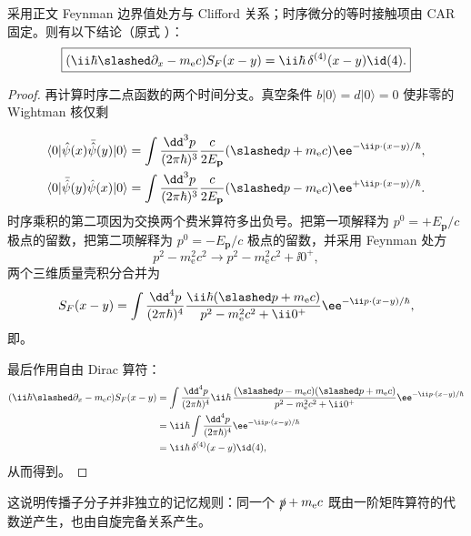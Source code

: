 \begin{proposition}
采用正文 Feynman 边界值处方与 Clifford 关系；时序微分的等时接触项由 CAR 固定。则有以下结论（原式 ）：
\begin{equation*}
 \boxed{
 (\ii\hbar\slashed\partial_x-m_{\mathrm e} c)S_F(x-y)
 =\ii\hbar\,\delta^{(4)}(x-y)\id(4).}
\end{equation*}
\end{proposition}
\begin{proof}
再计算时序二点函数的两个时间分支。真空条件 $b|0\rangle=d|0\rangle=0$ 使非零的 Wightman 核仅剩

\begin{align*}
 \langle0|\hat\psi(x)\bar{\hat\psi}(y)|0\rangle
 &=\int\frac{\dd^3 p}{(2\pi\hbar)^3}\frac{c}{2E_{\mathbf p}}
 (\slashed p+m_{\mathrm e} c)\ee^{-\ii p\cdot(x-y)/\hbar},\\
 \langle0|\bar{\hat\psi}(y)\hat\psi(x)|0\rangle
 &=\int\frac{\dd^3 p}{(2\pi\hbar)^3}\frac{c}{2E_{\mathbf p}}
 (\slashed p-m_{\mathrm e} c)\ee^{+\ii p\cdot(x-y)/\hbar}.
\end{align*}
时序乘积的第二项因为交换两个费米算符多出负号。把第一项解释为 $p^0=+E_{\mathbf p}/c$ 极点的留数，把第二项解释为 $p^0=-E_{\mathbf p}/c$ 极点的留数，并采用 Feynman 处方
\begin{equation*}
 p^2-m_{\mathrm e}^2c^2\longrightarrow p^2-m_{\mathrm e}^2c^2+\ii0^+,
\end{equation*}
两个三维质量壳积分合并为
\begin{equation*}
 S_F(x-y)
 =\int\frac{\dd^4 p}{(2\pi\hbar)^4}
 \frac{\ii\hbar(\slashed p+m_{\mathrm e} c)}{p^2-m_{\mathrm e}^2c^2+\ii0^+}
 \ee^{-\ii p\cdot(x-y)/\hbar},
\end{equation*}
即。

最后作用自由 Dirac 算符：
\begin{align*}
 (\ii\hbar\slashed\partial_x-m_{\mathrm e} c)S_F(x-y)
 &=\int\frac{\dd^4 p}{(2\pi\hbar)^4}\ii\hbar\,
 \frac{(\slashed p-m_{\mathrm e} c)(\slashed p+m_{\mathrm e} c)}{p^2-m_{\mathrm e}^2c^2+\ii0^+}
 \ee^{-\ii p\cdot(x-y)/\hbar}\\
 &=\ii\hbar\int\frac{\dd^4 p}{(2\pi\hbar)^4}
 \ee^{-\ii p\cdot(x-y)/\hbar}\\
 &=\ii\hbar\,\delta^{(4)}(x-y)\id(4),
\end{align*}
从而得到。
\end{proof}

这说明传播子分子并非独立的记忆规则：同一个 $\slashed p+m_{\mathrm e} c$ 既由一阶矩阵算符的代数逆产生，也由自旋完备关系产生。

